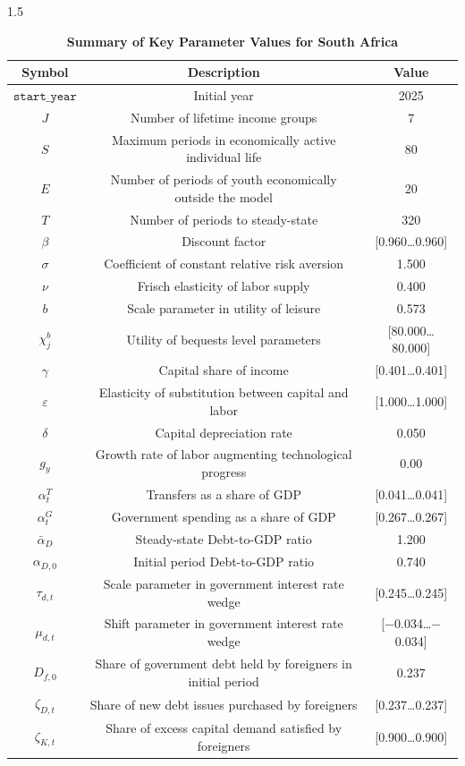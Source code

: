 \documentclass[letterpaper,12pt]{article}
\theoremstyle{definition}
\newcommand{\smallsize}{\small}
\begin{document}
\begin{spacing}{1.5}
\begin{table}[htbp]\centering\captionsetup{width=6.0in}
  \caption{\label{tab:zaf_params}\textbf{Summary of Key Parameter Values for South Africa}}
  \begin{threeparttable}
  \begin{tabular}{>{\smallsize}c |>{\smallsize}c |>{\smallsize}c}
\hline
\textbf{Symbol} & \textbf{Description} & \textbf{Value} \\
\hline
$\texttt{start\_year}$ & Initial year & 2025 \\
$J$ & Number of lifetime income groups & 7 \\
$S$ & Maximum periods in economically active individual life & 80 \\
$E$ & Number of periods of youth economically outside the model & 20 \\
$T$ & Number of periods to steady-state & 320 \\
$\beta$ & Discount factor & [0.960\ldots0.960] \\
$\sigma$ & Coefficient of constant relative risk aversion & 1.500 \\
$\nu$ & Frisch elasticity of labor supply & 0.400 \\
$b$ & Scale parameter in utility of leisure & 0.573 \\
$\chi^{b}_{j}$ & Utility of bequests level parameters & [80.000\ldots80.000] \\
$\gamma$ & Capital share of income & [0.401\ldots0.401] \\
$\varepsilon$ & Elasticity of substitution between capital and labor & [1.000\ldots1.000] \\
$\delta$ & Capital depreciation rate & 0.050 \\
$g_{y}$ & Growth rate of labor augmenting technological progress & 0.00 \\
$\alpha^{T}_{t}$ & Transfers as a share of GDP & [0.041\ldots0.041] \\
$\alpha^{G}_{t}$ & Government spending as a share of GDP & [0.267\ldots0.267] \\
$\bar{\alpha}_{D}$ & Steady-state Debt-to-GDP ratio & 1.200 \\
$\alpha_{D,0}$ & Initial period Debt-to-GDP ratio & 0.740 \\
$\tau_{d,t}$ & Scale parameter in government interest rate wedge & [0.245\ldots0.245] \\
$\mu_{d,t}$ & Shift parameter in government interest rate wedge & [$-$0.034\ldots$-$0.034] \\
$D_{f,0}$ & Share of government debt held by foreigners in initial period & 0.237 \\
$\zeta_{D,t}$ & Share of new debt issues purchased by foreigners & [0.237\ldots0.237] \\
$\zeta_{K,t}$ & Share of excess capital demand satisfied by foreigners & [0.900\ldots0.900] \\
  \end{tabular}
  \end{threeparttable}
\end{table}




\end{spacing}
\end{document}
